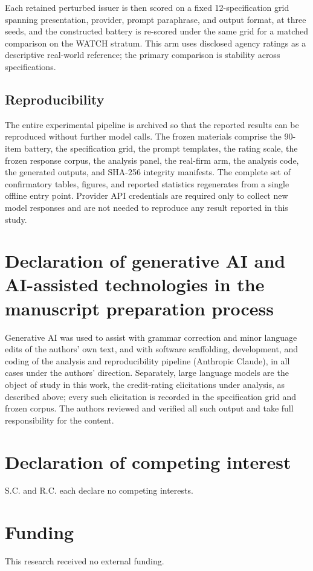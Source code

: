 \documentclass[a4paper,fleqn]{cas-sc}
\begin{document}
Each retained perturbed issuer is then scored on a fixed 12-specification grid spanning presentation,
provider, prompt paraphrase, and output format, at three seeds, and the constructed battery is re-scored
under the same grid for a matched comparison on the WATCH stratum. This arm uses disclosed agency ratings
as a descriptive real-world reference; the primary comparison is stability across specifications.

\subsection{Reproducibility}
The entire experimental pipeline is archived so that the reported results can be reproduced without
further model calls. The frozen materials comprise the 90-item battery, the specification grid, the
prompt templates, the rating scale, the frozen response corpus, the analysis panel, the real-firm arm,
the analysis code, the generated outputs, and SHA-256 integrity manifests. The complete set of
confirmatory tables, figures, and reported statistics regenerates from a single offline entry point.
Provider API credentials are required only to collect new model responses and are not needed to reproduce
any result reported in this study.

\section*{Declaration of generative AI and AI-assisted technologies in the manuscript preparation process}
Generative AI was used to assist with grammar correction and minor language edits of the authors' own
text, and with software scaffolding, development, and coding of the analysis and reproducibility pipeline
(Anthropic Claude), in all cases under the authors' direction. Separately, large language models are the
object of study in this work, the credit-rating elicitations under analysis, as described above; every
such elicitation is recorded in the specification grid and frozen corpus. The authors reviewed and
verified all such output and take full responsibility for the content.


\section*{Declaration of competing interest}
S.C. and R.C. each declare no competing interests.

\section*{Funding}
This research received no external funding.
\end{document}
